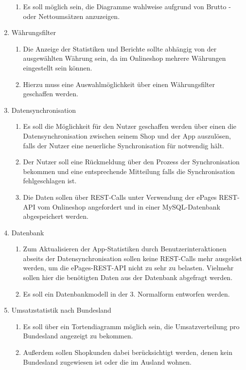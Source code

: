 \begin{enumerate}
\begin{enumerate}
\item Es soll möglich sein, die Diagramme wahlweise aufgrund von Brutto - oder Nettoumsätzen anzuzeigen.
\end{enumerate}
\item Währungsfilter
\begin{enumerate}
\item Die Anzeige der Statistiken und Berichte sollte abhängig von der  ausgewählten Währung sein, da im Onlineshop mehrere Währungen eingestellt sein können.
\item Hierzu muss eine Auswahlmöglichkeit über einen Währungsfilter geschaffen werden.
\end{enumerate}
\item Datensynchronisation
\begin{enumerate}
\item Es soll die Möglichkeit für den Nutzer geschaffen werden über einen  die Datensynchronisation zwischen seinem Shop und der App auszulösen, falls der Nutzer eine neuerliche Synchronisation für notwendig hält.
\item Der Nutzer soll eine Rückmeldung über den Prozess der Synchronisation bekommen und eine entsprechende Mitteilung falls die Synchronisation fehlgeschlagen ist.
\item Die Daten sollen über \acs{REST}-Calls unter Verwendung der ePages \acs{REST-API} vom Onlineshop angefordert und in einer \acs{MySQL}-Datenbank abgespeichert werden.
\end{enumerate}
\newpage
\item Datenbank
\begin{enumerate}
\item Zum Aktualisieren der App-Statistiken durch Benutzerinteraktionen abseits der Datensynchronisation sollen keine \acs{REST}-Calls mehr ausgelöst werden, um die ePages-REST-API nicht zu sehr zu belasten. Vielmehr sollen hier die benötigten Daten aus der Datenbank abgefragt werden.
\item Es soll ein Datenbankmodell in der 3. Normalform entworfen werden.
\end{enumerate}
\item Umsatzstatistik nach Bundesland
\begin{enumerate}
\item Es soll über ein Tortendiagramm möglich sein, die Umsatzverteilung pro Bundesland angezeigt zu bekommen.
\item Außerdem sollen Shopkunden dabei berücksichtigt werden, denen kein Bundesland zugewiesen ist oder die im Ausland wohnen.

\end{enumerate}
\end{enumerate}
